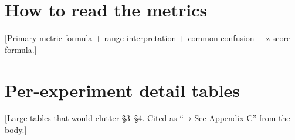 \documentclass[11pt, letterpaper]{article}
\begin{document}
\section{How to read the metrics}
\label{app:metric}
[Primary metric formula + range interpretation + common confusion + z-score formula.]

\section{Per-experiment detail tables}
\label{app:detail}
[Large tables that would clutter §3--§4. Cited as ``→ See Appendix C'' from the body.]



\end{document}
